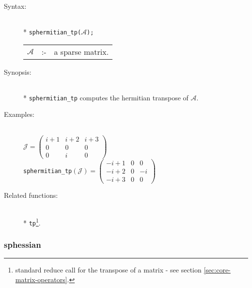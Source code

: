 \begin{description}
\item[Syntax:]\mbox{}\\*
\texttt{sphermitian\_tp($\mathcal{A}$);}\\[2mm]
\begin{tabular}{l l l}
$\mathcal{A}$ &:-& a sparse matrix.
\end{tabular}

\item[Synopsis:]\mbox{}\\*
                \texttt{sphermitian\_tp} computes the hermitian transpose of
                $\mathcal{A}$.

\item[Examples:]\mbox{}\\
\(\mathcal{J} = \begin{pmatrix} i+1 & i+2 & i+3 \\ 0 & 0 & 0 \\ 0 & i & 0 \end{pmatrix}\) \\[2mm]
\texttt{sphermitian\_tp}\((\mathcal{J}) =
\begin{pmatrix} -i+1 & 0 & 0 \\ -i+2 & 0 & -i \\-i+3 & 0 & 0\end{pmatrix}\)

\item[Related functions:]\mbox{}\\*
\texttt{tp}\footnote{standard reduce call for the
transpose of a matrix - see section \protect\ref{sec:core-matrix-operators}.}.
\end{description}

\subsubsection{sphessian}
\label{sparse:sphessian}
\hypertarget{operator:SPHESSIAN}{}

